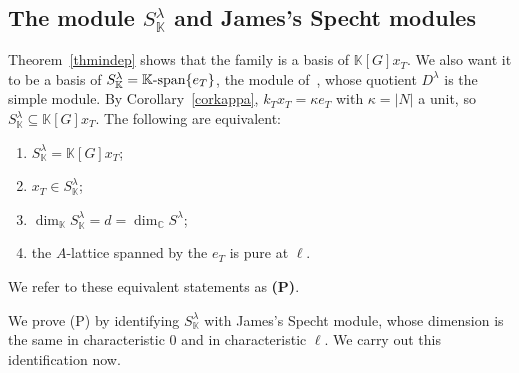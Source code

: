\documentclass[11pt, letterpaper]{amsart}
\let\amstext\text
\renewcommand{\text}[1]{\amstext{\upshape #1}}%
\theoremstyle{definition}
\theoremstyle{remark}
\newcommand{\KK}{\mathbb{K}}
\newcommand{\CC}{\mathbb{C}}
\begin{document}
\subsection{The module \texorpdfstring{$S^\lambda_\KK$}{S(lambda,K)} and James's Specht modules}\label{subJames}

Theorem~\ref{thmindep} shows that the family is a basis of $\KK[G]x_T$. We also want it to be a basis of $S^\lambda_\KK=\KK\text{-span}\{e_T\}$, the module of~\cite{AN2}, whose quotient $D^\lambda$ is the simple module. By Corollary~\ref{corkappa}, $k_Tx_T=\kappa e_T$ with $\kappa=|N|$ a unit, so $S^\lambda_\KK\subseteq\KK[G]x_T$. The following are equivalent:
\begin{enumerate}
\item[(i)] $S^\lambda_\KK=\KK[G]x_T$;
\item[(ii)] $x_T\in S^\lambda_\KK$;
\item[(iii)] $\dim_\KK S^\lambda_\KK=d=\dim_\CC S^\lambda$;
\item[(iv)] the $A$-lattice spanned by the $e_T$ is pure at $\ell$.
\end{enumerate}
We refer to these equivalent statements as \textbf{(P)}.

We prove (P) by identifying $S^\lambda_\KK$ with James's Specht module, whose dimension is the same in characteristic $0$ and in characteristic $\ell$. We carry out this identification now.
\end{document}

